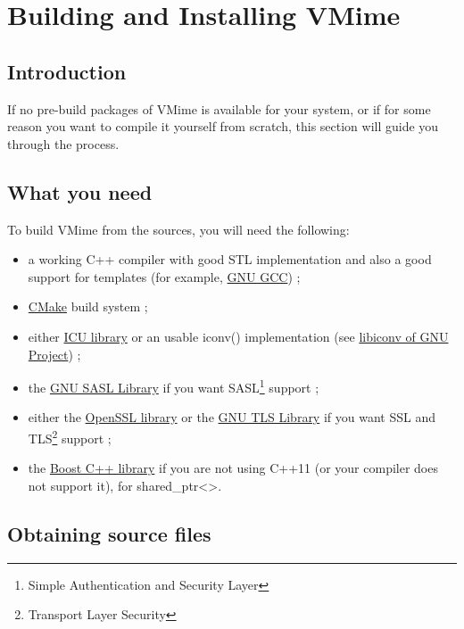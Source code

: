 \label{chapter_building}
\chapter{Building and Installing VMime}

\section{Introduction}

If no pre-build packages of VMime is available for your system, or if for some
reason you want to compile it yourself from scratch, this section will guide
you through the process.

\section{What you need}

To build VMime from the sources, you will need the following:

\begin{itemize}
\item a working C++ compiler with good STL implementation and also a good
support for templates (for example, \href{http://gcc.gnu.org/}{GNU GCC}) ;
\item \href{http://www.cmake.org/}{CMake} build system ;
\item either \href{http://www.icu-project.org}{ICU library} or an usable
{\vcode iconv()} implementation (see
\href{http://www.gnu.org/software/libiconv/}{libiconv of GNU Project}) ;
\item the \href{http://www.gnu.org/software/gsasl/}{GNU SASL Library} if you
want SASL\footnote{Simple Authentication and Security Layer} support ;
\item either the \href{http://www.openssl.org}{OpenSSL library} or the
\href{http://www.gnu.org/software/gnutls/}{GNU TLS Library} if you
want SSL and TLS\footnote{Transport Layer Security} support ;
\item the \href{http://www.boost.org}{Boost C++ library} if you are not using
C++11 (or your compiler does not support it), for {\vcode shared\_ptr<>}.
\end{itemize}

\section{Obtaining source files}

